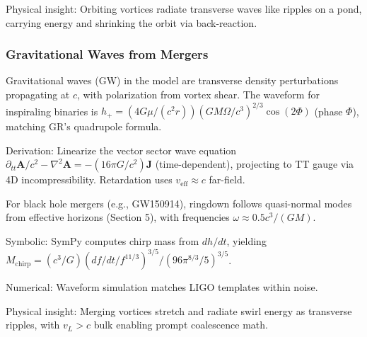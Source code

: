 \documentclass{article}
\begin{document}
Physical insight: Orbiting vortices radiate transverse waves like ripples on a pond, carrying energy and shrinking the orbit via back-reaction.

\medskip
\noindent
{}
\medskip

\subsubsection{Gravitational Waves from Mergers}

Gravitational waves (GW) in the model are transverse density perturbations propagating at $c$, with polarization from vortex shear. The waveform for inspiraling binaries is $h_+ = (4 G \mu / (c^2 r)) (G M \Omega / c^3)^{2/3} \cos(2 \Phi)$ (phase $\Phi$), matching GR's quadrupole formula.

Derivation: Linearize the vector sector wave equation $\partial_{tt} \mathbf{A} / c^2 - \nabla^2 \mathbf{A} = - (16\pi G / c^2) \mathbf{J}$ (time-dependent), projecting to TT gauge via 4D incompressibility. Retardation uses $v_{\text{eff}} \approx c$ far-field.

For black hole mergers (e.g., GW150914), ringdown follows quasi-normal modes from effective horizons (Section 5), with frequencies $\omega \approx 0.5 c^3 / (G M)$.

Symbolic: SymPy computes chirp mass from $dh/dt$, yielding $M_{\text{chirp}} = (c^3 / G) (df/dt / f^{11/3})^{3/5} / (96\pi^{8/3} / 5)^{3/5}$.

Numerical: Waveform simulation matches LIGO templates within noise.

Physical insight: Merging vortices stretch and radiate swirl energy as transverse ripples, with $v_L > c$ bulk enabling prompt coalescence math.

\medskip
\noindent
{}
\medskip
\end{document}
